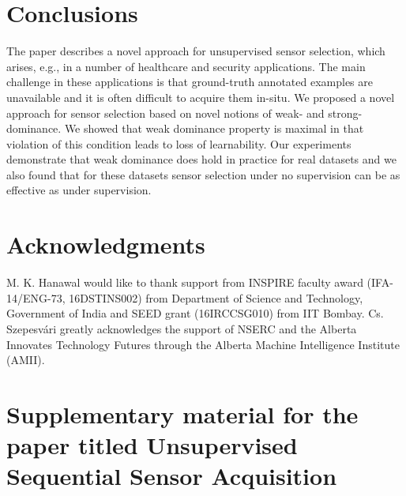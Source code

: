 \documentclass[10pt]{article}
\newcommand{\ses}{sensor selection\xspace}
\begin{document}
\section{Conclusions}
\label{sec:Conclu}
%
\vspace{-10pt}
The paper describes a novel approach for unsupervised \ses, which arises, e.g., in a number of healthcare and security applications.
The main challenge in these applications is that ground-truth annotated examples are unavailable and it is often difficult to acquire them in-situ. We proposed a novel approach for \ses based on novel notions of weak- and strong-dominance. We showed that weak dominance property is maximal in that violation of this condition leads to loss of learnability. Our experiments demonstrate that weak dominance does hold in practice for real datasets and we also found that for these datasets \ses under no supervision can be as effective as under supervision.

\section*{Acknowledgments}
\label{sec:Ack}
M. K. Hanawal would like to thank support from INSPIRE faculty award (IFA-14/ENG-73, 16DSTINS002) from Department of Science and Technology, Government of India and SEED grant (16IRCCSG010) from IIT Bombay. 
Cs. Szepesv\'ari greatly acknowledges the support of NSERC and the Alberta Innovates Technology Futures through the Alberta  Machine Intelligence Institute (AMII).
%



\newpage
\section*{\large Supplementary material for the paper titled Unsupervised Sequential Sensor Acquisition}
\hrulefill \hrulefill
\hrulefill
\fi


\end{document}

